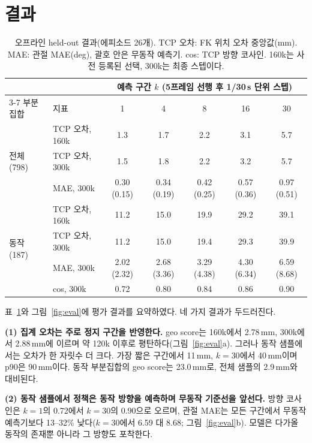 \documentclass[conference,10pt]{IEEEtran}
\newcommand{\mm}{\,mm\xspace}
\begin{document}
\section{결과}\label{sec:results}
\begin{table}[t]
\centering\footnotesize
\setlength{\tabcolsep}{7pt}
\caption{오프라인 held-out 결과(에피소드 26개). TCP 오차: FK 위치 오차 중앙값(mm). MAE: 관절 MAE(deg), 괄호 안은 무동작 예측기.
cos: TCP 방향 코사인. 160k는 사전 등록된 선택, 300k는 최종 스텝이다.}
\label{tab:results}
\begin{tabular}{@{}llccccc@{}}
\toprule
 & & \multicolumn{5}{c}{예측 구간 $k$ (5프레임 선행 후 1/30\,s 단위 스텝)} \\
\cmidrule(l){3-7}
부분집합 & 지표 & 1 & 4 & 8 & 16 & 30 \\
\midrule
\multirow{3}{*}{전체 (798)} & TCP 오차, 160k & 1.3 & 1.7 & 2.2 & 3.1 & 5.7 \\
 & TCP 오차, 300k & 1.5 & 1.8 & 2.2 & 3.2 & 5.7 \\
 & MAE, 300k & 0.30 (0.15) & 0.34 (0.19) & 0.42 (0.25) & 0.57 (0.36) & 0.97 (0.51) \\
\midrule
\multirow{4}{*}{동작 (187)} & TCP 오차, 160k & 11.2 & 15.0 & 19.9 & 29.2 & 39.1 \\
 & TCP 오차, 300k & 11.2 & 15.0 & 19.4 & 29.3 & 39.9 \\
 & MAE, 300k & 2.02 (2.32) & 2.68 (3.36) & 3.29 (4.38) & 4.30 (6.34) & 6.59 (8.68) \\
 & cos, 300k & 0.72 & 0.80 & 0.84 & 0.86 & 0.90 \\
\bottomrule
\end{tabular}
\end{table}

표~\ref{tab:results}와 그림~\ref{fig:eval}에 평가 결과를 요약하였다. 네 가지 결과가 두드러진다.

\textbf{(1) 집계 오차는 주로 정지 구간을 반영한다.} geo score는 160k에서 2.78\mm, 300k에서 2.88\mm{}에 이르며 약 120k 이후로
평탄하다(그림~\ref{fig:eval}a). 그러나 동작 샘플에서는 오차가 한 자릿수 더 크다. 가장 짧은 구간에서 11\mm, $k{=}30$에서 40\mm{}이며
p90은 90\mm{}이다. 동작 부분집합의 geo score는 23.0\mm{}로, 전체 샘플의 2.9\mm{}와 대비된다.

\textbf{(2) 동작 샘플에서 정책은 동작 방향을 예측하며 무동작 기준선을 앞선다.} 방향 코사인은 $k{=}1$의 0.72에서 $k{=}30$의 0.90으로
오르며, 관절 MAE는 모든 구간에서 무동작 예측기보다 13--32\% 낮다($k{=}30$에서 6.59 대 8.68\textdegree{}; 그림~\ref{fig:eval}b).
모델은 다가올 동작의 존재뿐 아니라 그 방향도 포착한다.
\end{document}
